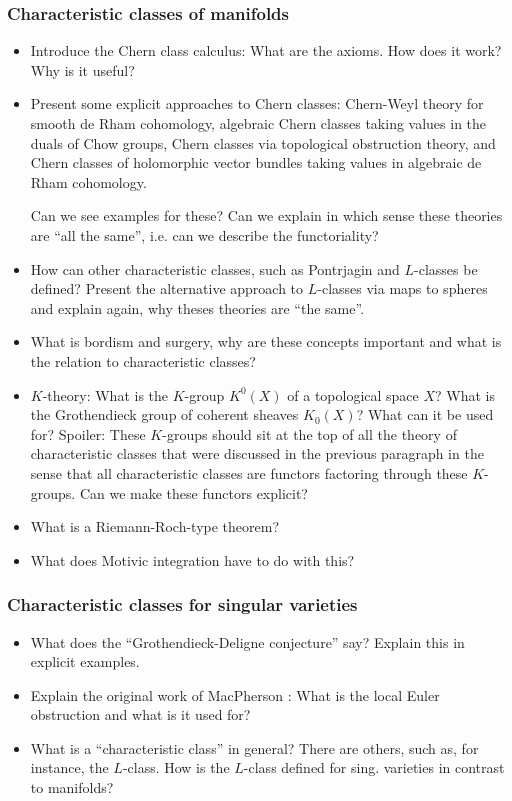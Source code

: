 \documentclass[a4paper]{article}
\begin{document}
\subsubsection*{Characteristic classes of manifolds%
}
\begin{itemize}
  \item Introduce the Chern class calculus: What are the axioms. How does it work? 
    Why is it useful? 
  \item Present some explicit approaches to Chern classes: Chern-Weyl theory for 
    smooth de Rham cohomology, algebraic Chern classes taking values in the 
    duals of Chow groups, Chern classes via topological obstruction theory, 
    and Chern classes of holomorphic vector bundles taking values in algebraic 
    de Rham cohomology.

    Can we see examples for these? Can we explain in which sense these theories 
    are ``all the same'', i.e. can we describe the functoriality? 
%
  \item How can other characteristic classes, such as Pontrjagin and $L$-classes be defined?
	Present the alternative approach to $L$-classes via maps to spheres and explain again,
	why theses theories are ``the same''.
  \item What is bordism and surgery, why are these concepts important and what is the relation
	to characteristic classes?
%
  \item $K$-theory: What is the $K$-group $K^0(X)$ of a topological space $X$? 
    What is the Grothendieck group of coherent sheaves $K_0(X)$? 
    What can it be used for? Spoiler: These $K$-groups should sit at the top 
    of all the theory of characteristic classes that were discussed in the 
    previous paragraph in the sense that all characteristic classes are functors 
    factoring through these $K$-groups. Can we make these functors explicit? 
  \item What is a Riemann-Roch-type theorem? 
  \item What does Motivic integration have to do with this? 
\end{itemize}

\subsubsection*{Characteristic classes for singular varieties}
\begin{itemize}
  \item What does the ``Grothendieck-Deligne conjecture'' say? Explain this 
    in explicit examples. 
  \item Explain the original work of MacPherson \cite{MacPherson74}: 
    What is the local Euler obstruction and what is it used for? 
  \item What is a ``characteristic class'' in general? There are others, 
    such as, for instance, the $L$-class. 
    How is the $L$-class defined for sing. varieties in contrast to manifolds?
\end{itemize}
\end{document}
